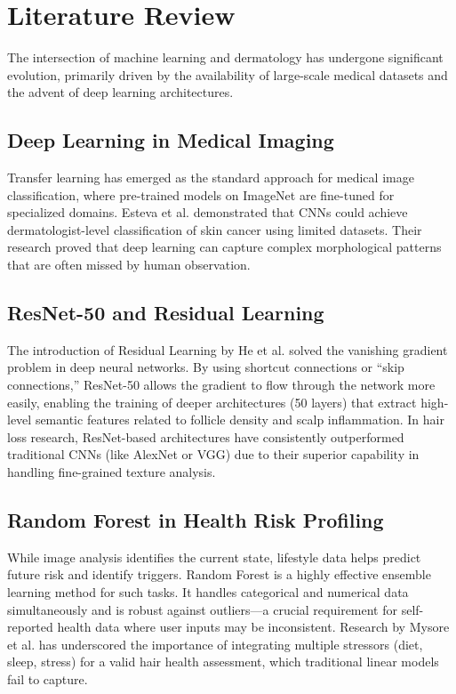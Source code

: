 \documentclass[conference]{IEEEtran}
\begin{document}
\section{Literature Review}
The intersection of machine learning and dermatology has undergone significant evolution, primarily driven by the availability of large-scale medical datasets and the advent of deep learning architectures.

\subsection{Deep Learning in Medical Imaging}
Transfer learning has emerged as the standard approach for medical image classification, where pre-trained models on ImageNet are fine-tuned for specialized domains. Esteva et al. \cite{esteva2017} demonstrated that CNNs could achieve dermatologist-level classification of skin cancer using limited datasets. Their research proved that deep learning can capture complex morphological patterns that are often missed by human observation.

\subsection{ResNet-50 and Residual Learning}
The introduction of Residual Learning by He et al. \cite{he2016} solved the vanishing gradient problem in deep neural networks. By using shortcut connections or ``skip connections,'' ResNet-50 allows the gradient to flow through the network more easily, enabling the training of deeper architectures (50 layers) that extract high-level semantic features related to follicle density and scalp inflammation. In hair loss research, ResNet-based architectures have consistently outperformed traditional CNNs (like AlexNet or VGG) due to their superior capability in handling fine-grained texture analysis.

\subsection{Random Forest in Health Risk Profiling}
While image analysis identifies the current state, lifestyle data helps predict future risk and identify triggers. Random Forest \cite{breiman2001} is a highly effective ensemble learning method for such tasks. It handles categorical and numerical data simultaneously and is robust against outliers—a crucial requirement for self-reported health data where user inputs may be inconsistent. Research by Mysore et al. \cite{mysore2019} has underscored the importance of integrating multiple stressors (diet, sleep, stress) for a valid hair health assessment, which traditional linear models fail to capture.
\end{document}
